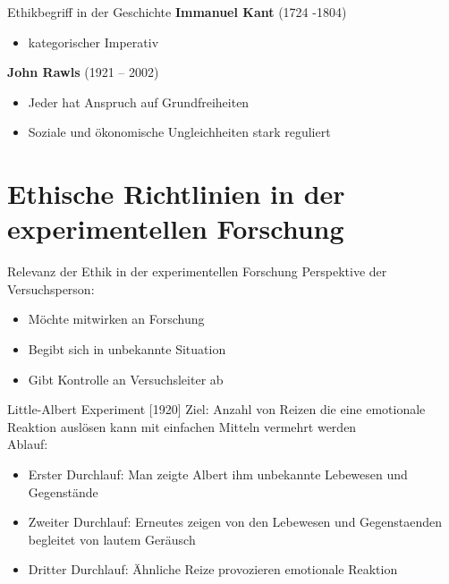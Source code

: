 \documentclass[10pt]{beamer}
\begin{document}
	\begin{frame}{Ethikbegriff in der Geschichte}
		\textbf{Immanuel Kant} (1724 -1804)
		\begin{itemize}
			\item kategorischer Imperativ
		\end{itemize}
		
		\textbf{John Rawls} (1921 – 2002) 
		\begin{itemize}
			\item Jeder hat Anspruch auf Grundfreiheiten
			\item Soziale und ökonomische Ungleichheiten stark reguliert
		\end{itemize}
	\end{frame}
\section{Ethische Richtlinien in der experimentellen Forschung}
	\begin{frame}{Relevanz der Ethik in der experimentellen Forschung}
		Perspektive der Versuchsperson:
		\begin{itemize}
		\item Möchte mitwirken an Forschung	%
		\item Begibt sich in unbekannte Situation
		\item Gibt Kontrolle an Versuchsleiter ab %
		\end{itemize}
		
	\end{frame}
	
	
		\begin{frame}{Little-Albert Experiment [1920]}
			Ziel: Anzahl von Reizen die eine emotionale Reaktion auslösen kann mit einfachen Mitteln vermehrt werden\\
			
			Ablauf:
			\begin{itemize}
				\item Erster Durchlauf: Man zeigte Albert ihm unbekannte Lebewesen und Gegenstände
				\item Zweiter Durchlauf: Erneutes zeigen von den Lebewesen und Gegenstaenden begleitet von lautem Geräusch
				\item Dritter Durchlauf: Ähnliche Reize provozieren emotionale Reaktion
			\end{itemize}
					\end{frame}
	
\end{document}
